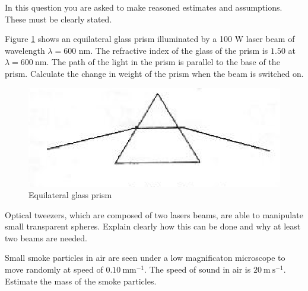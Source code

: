 \begin{problem}
    In this question you are asked to make reasoned estimates and assumptions. These must be clearly stated.
    \begin{partproblem}
        Figure \ref{2011q2} shows an equilateral glass prism illuminated by a 100 W laser beam of wavelength $\lambda=600$ nm. The refractive index of the glass of the prism is $1.50$ at $\lambda=600 \mathrm{~nm}$. The path of the light in the prism is parallel to the base of the prism. Calculate the change in weight of the prism when the beam is switched on.
        \begin{figure}[h]
	        \centering
	        \includegraphics[width=0.8\linewidth]{spho_book_TYS_images/2011q2.png}
	        \caption{Equilateral glass prism} \label{2011q2}
        \end{figure}
    \end{partproblem}
    
    \begin{partproblem}
        Optical tweezers, which are composed of two lasers beams, are able to manipulate small transparent spheres. Explain clearly how this can be done and why at least two beams are needed.
    \end{partproblem}
    
    \begin{partproblem}
        Small smoke particles in air are seen under a low magnificaton microscope to move randomly at speed of $0.10 \mathrm{~mm}^{-1}$. The speed of sound in air is $20 \mathrm{~m} \mathrm{~s}^{-1}$. Estimate the mass of the smoke particles.
    \end{partproblem}
\end{problem}

